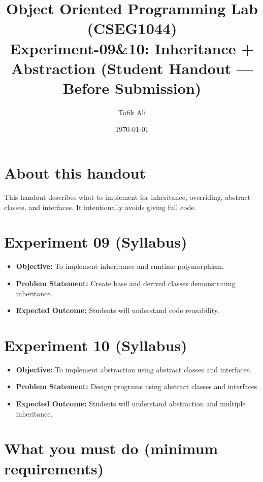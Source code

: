 \documentclass[11pt]{article}
\title{Object Oriented Programming Lab (CSEG1044)\\Experiment-09\&10: Inheritance + Abstraction (Student Handout --- Before Submission)}
\author{Tofik Ali}
\date{\today}
\begin{document}
\maketitle
\tableofcontents

\section{About this handout}
This handout describes what to implement for inheritance, overriding, abstract classes, and interfaces.
It intentionally avoids giving full code.

\section{Experiment 09 (Syllabus)}
\begin{itemize}[leftmargin=*]
  \item \textbf{Objective:} To implement inheritance and runtime polymorphism.
  \item \textbf{Problem Statement:} Create base and derived classes demonstrating inheritance.
  \item \textbf{Expected Outcome:} Students will understand code reusability.
\end{itemize}

\section{Experiment 10 (Syllabus)}
\begin{itemize}[leftmargin=*]
  \item \textbf{Objective:} To implement abstraction using abstract classes and interfaces.
  \item \textbf{Problem Statement:} Design programs using abstract classes and interfaces.
  \item \textbf{Expected Outcome:} Students will understand abstraction and multiple inheritance.
\end{itemize}

\section{What you must do (minimum requirements)}
\end{document}

